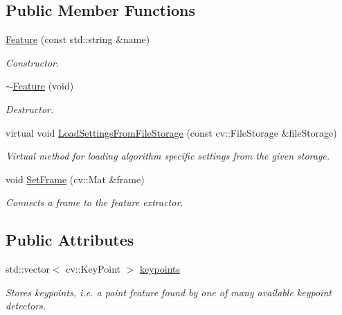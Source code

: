 \subsection*{Public Member Functions}
\begin{DoxyCompactItemize}
\item 
\hyperlink{class_feature_a020e991990bb6ca904015ffa7902d55f}{Feature} (const std\-::string \&name)
\begin{DoxyCompactList}\small\item\em Constructor. \end{DoxyCompactList}\item 
\hyperlink{class_feature_ab6dfcfe22cc71c7b45a61d991b4ff775}{$\sim$\-Feature} (void)
\begin{DoxyCompactList}\small\item\em Destructor. \end{DoxyCompactList}\item 
virtual void \hyperlink{class_feature_a2ce73a191961cbd5f8fe8bc47f4e08c1}{Load\-Settings\-From\-File\-Storage} (const cv\-::\-File\-Storage \&file\-Storage)
\begin{DoxyCompactList}\small\item\em Virtual method for loading algorithm specific settings from the given storage. \end{DoxyCompactList}\item 
void \hyperlink{class_feature_a72f15196406066e9758c8c1b8be9318d}{Set\-Frame} (cv\-::\-Mat \&frame)
\begin{DoxyCompactList}\small\item\em Connects a frame to the feature extractor. \end{DoxyCompactList}\end{DoxyCompactItemize}
\subsection*{Public Attributes}
\begin{DoxyCompactItemize}
\item 
std\-::vector$<$ cv\-::\-Key\-Point $>$ \hyperlink{class_feature_a7e1fc96f926cad9da3db0397a99c0079}{keypoints}
\begin{DoxyCompactList}\small\item\em Stores keypoints, i.\-e. a point feature found by one of many available keypoint detectors. \end{DoxyCompactList}\end{DoxyCompactItemize}
